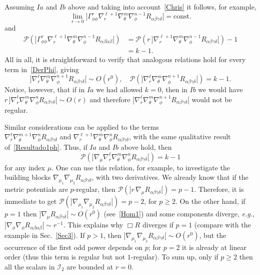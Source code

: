 \documentclass[aps,prd,a4paper,twocolumn,showpacs,showkeys,preprintnumbers,amsmath,amssymb,nofootinbib]{revtex4-2}
\numberwithin{equation}{section}
\def\beq{\begin{equation}}
\def\eeq{\end{equation}}
\def\al{\alpha}
\def\be{\beta}
\def\ga{\gamma}
\def\Ga{\Gamma}
\def\de{\delta}
\def\th{\theta}
\def\na{\nabla}
\begin{document}
%
Assuming $Ia$ and $Ib$ above and taking into account~\eqref{Chris} it follows, for example,
\beq
\lim_{r\to 0} {]\Ga^r_{\phi\phi} \na_r^{\ell+1} \na_\th^m \na_\phi^{n-1} R_{\al\be\ga\de}[} = \text{const.}
\nonumber
\eeq
and
\beq
\begin{split}
\mathscr{P}( {]\Ga^r_{\phi\phi} \na_r^{\ell+1} \na_\th^m \na_\phi^{n-1} R_{\al\be\al\be}[}) & = \mathscr{P}( r \, {] \na_r^{\ell+1} \na_\th^m \na_\phi^{n-1} R_{\al\be\ga\de}[}) - 1 
\nonumber
\\
& = k-1.
\end{split}
\eeq
%
All in all, it is straightforward to verify that analogous relations hold for every term in~\eqref{DerPhi}, giving
%
\beq \label{Resultado1ph}
{]\na_r^\ell \na_\th^m \na_\phi^{n+1} R_{\al\be\ga\de}[} \sim O(r^0) , 
\quad \mathscr{P}( {]\na_r^\ell \na_\th^m \na_\phi^{n+1} R_{\al\be\ga\de}[}) = k - 1.
\eeq
Notice, however, that if in $Ia$ we had allowed $k=0$, then in $Ib$ we would have $r \, {]\na_r^{\ell} \na_\th^m \na_\phi^n R_{\al\be\ga\de}[} \sim O(r)$ and therefore ${]\na_r^\ell \na_\th^m \na_\phi^{n+1} R_{\al\be\ga\de}[}$ would not be regular.

Similar considerations can be applied to the terms \\ $\na_r^\ell \na_\th^{m+1} \na_\phi^n R_{\al\be\ga\de}$ and $\na_r^{\ell+1} \na_\th^m \na_\phi^n R_{\al\be\ga\de}$, with the same qualitative result of~\eqref{Resultado1ph}.  Thus, if $Ia$ and $Ib$ above hold, then 
%
\beq
\mathscr{P}({]\na_\mu \na_r^\ell \na_\th^m \na_\phi^n R_{\al\be\ga\de}[}) =  k-1
\eeq 
for any index $\mu$. 
One can use this relation, for example, to investigate the building blocks $\na_{\mu_1} \na_{\mu_2} R_{\al\be\ga\de}$, with two derivatives. We already know that if the metric potentials are $p$-regular, then $\mathscr{P}({] r \, \na_\mu R_{\al\be\ga\de}[}) = p - 1$. Therefore, it is immediate to get $\mathscr{P}({] \na_{\mu_1} \na_{\mu_2} R_{\al\be\ga\de}[}) = p - 2$, for $p \geqslant 2$. On the other hand,
if $p=1$ then  ${] \na_\mu R_{\al\be\ga\de}[} \sim O(r^0)$ (see~\eqref{Hom1}) and some components diverge, \textit{e.g.},  ${] \na_\phi \na_\phi R_{\al\be\al\be}[} \sim r^{-1}$. This explains why $\Box R$ diverges if $p=1$ (compare with the example in Sec.~\ref{Sec3}). If $p>1$, then ${] \na_{\mu_1} \na_{\mu_2} R_{\al\be\ga\de}[} \sim O(r^{0})$, but the occurrence of the first odd power depends on $p$; for $p=2$ it is already at linear order (thus this term is regular but not $1$-regular). To sum up, only if $p\geqslant 2$ then all the scalars in $\mathscr{I}_2$ are bounded at $r=0$.
\end{document}
